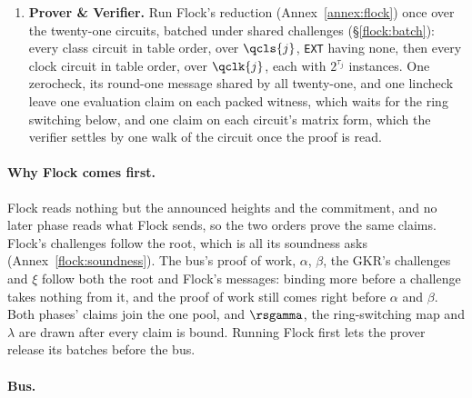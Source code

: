 \begin{enumerate}
\item \textbf{Prover \& Verifier.} Run Flock's reduction (Annex~\ref{annex:flock}) once over the twenty-one circuits, batched under shared challenges (\S\ref{flock:batch}): every class circuit in table order, over $\qcls{j}$, \texttt{EXT} having none, then every clock circuit in table order, over $\qclk{j}$, each with $2^{\tau_j}$ instances. One zerocheck, its round-one message shared by all twenty-one, and one lincheck leave one evaluation claim on each packed witness, which waits for the ring switching below, and one claim on each circuit's matrix form, which the verifier settles by one walk of the circuit once the proof is read.
\end{enumerate}

\paragraph{Why Flock comes first.} Flock reads nothing but the announced heights and the commitment, and no later phase reads what Flock sends, so the two orders prove the same claims. Flock's challenges follow the root, which is all its soundness asks (Annex~\ref{flock:soundness}). The bus's proof of work, $\alpha$, $\beta$, the GKR's challenges and $\xi$ follow both the root and Flock's messages: binding more before a challenge takes nothing from it, and the proof of work still comes right before $\alpha$ and $\beta$. Both phases' claims join the one pool, and $\rsgamma$, the ring-switching map and $\lambda$ are drawn after every claim is bound. Running Flock first lets the prover release its batches before the bus.

\paragraph{Bus.}

